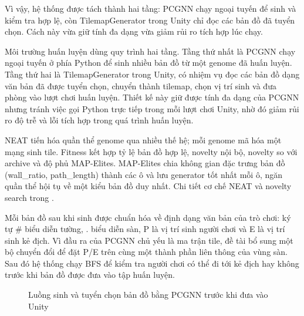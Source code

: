 Vì vậy, hệ thống được tách thành hai tầng: PCGNN chạy ngoại tuyến để sinh và kiểm tra hợp lệ, còn TilemapGenerator trong Unity chỉ đọc các bản đồ đã tuyển chọn. Cách này vừa giữ tính đa dạng vừa giảm rủi ro tích hợp lúc chạy.

Môi trường huấn luyện dùng quy trình hai tầng. Tầng thứ nhất là PCGNN chạy ngoại tuyến ở phía Python để sinh nhiều bản đồ từ một genome đã huấn luyện. Tầng thứ hai là TilemapGenerator trong Unity, có nhiệm vụ đọc các bản đồ dạng văn bản đã được tuyển chọn, chuyển thành tilemap, chọn vị trí sinh và đưa phòng vào lượt chơi huấn luyện. Thiết kế này giữ được tính đa dạng của PCGNN nhưng tránh việc gọi Python trực tiếp trong mỗi lượt chơi Unity, nhờ đó giảm rủi ro độ trễ và lỗi tích hợp trong quá trình huấn luyện.

NEAT tiến hóa quần thể genome qua nhiều thế hệ; mỗi genome mã hóa một mạng sinh tile. Fitness kết hợp tỷ lệ bản đồ hợp lệ, novelty nội bộ, novelty so với archive và độ phủ MAP-Elites. MAP-Elites chia không gian đặc trưng bản đồ (wall\_ratio, path\_length) thành các ô và lưu generator tốt nhất mỗi ô, ngăn quần thể hội tụ về một kiểu bản đồ duy nhất. Chi tiết cơ chế NEAT và novelty search trong \cite{Beukman2022}.


Mỗi bản đồ sau khi sinh được chuẩn hóa về định dạng văn bản của trò chơi: ký tự \# biểu diễn tường, . biểu diễn sàn, P là vị trí sinh người chơi và E là vị trí sinh kẻ địch. Vì đầu ra của PCGNN chủ yếu là ma trận tile, đề tài bổ sung một bộ chuyển đổi để đặt P/E trên cùng một thành phần liên thông của vùng sàn. Sau đó hệ thống chạy BFS để kiểm tra người chơi có thể đi tới kẻ địch hay không trước khi bản đồ được đưa vào tập huấn luyện.

\begin{figure}[H]
    \centering
    \caption{Luồng sinh và tuyển chọn bản đồ bằng PCGNN trước khi đưa vào Unity}
    \label{fig:map_generation_workflow}
\end{figure}

